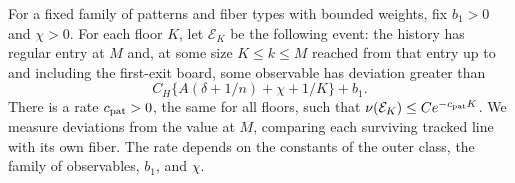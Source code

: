 \begin{proposicion}\label{prop:concentracion-meso}
For a fixed family of patterns and fiber types with bounded weights, fix $b_1>0$ and $\chi>0$.
For each floor $K$, let $\mathcal E_K$ be the following event: the history has regular entry at $M$
and, at some size $K\le k\le M$ reached from that entry up to and including the first-exit board,
some observable has deviation greater than
\[
 C_H\{A(\delta+1/n)+\chi+1/K\}+b_1 .
\]
There is a rate $c_{\rm pat}>0$, the same for all floors, such that
$\nu(\mathcal E_K)\le C e^{-c_{\rm pat}K}$. We measure deviations from the value at $M$, comparing
each surviving tracked line with its own fiber.
The rate depends on the constants of the outer class, the family of observables, $b_1$, and $\chi$.
\end{proposicion}
